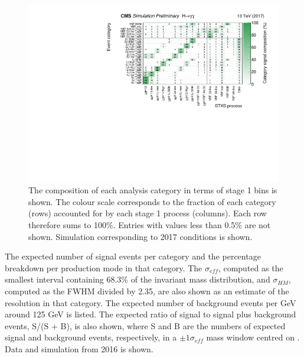 {\begin{figure}[hptb]
\centering
\includegraphics[width=\textwidth]{Figures/Results/Cats2017.pdf}
\caption{
  The composition of each analysis category in terms of stage 1 bins is shown. 
  The colour scale corresponds to the fraction of each category (rows) 
  accounted for by each stage 1 process (columns). 
  Each row therefore sums to 100\%. 
  Entries with values less than 0.5\% are not shown. 
  Simulation corresponding to 2017 conditions is shown.
}
\label{fig:results_Cats2017}
\end{figure}

\begin{landscape}
  \begin{table}
    \resizebox{1.5\textwidth}{!}{}
    \caption{
      The expected number of signal events per category and
      the percentage breakdown per production mode in that category. 
      The $\sigma_{eff}$, computed as the smallest interval containing 68.3\% 
      of the invariant mass distribution, and $\sigma_{HM}$, computed as the FWHM divided by 2.35,
      are also shown as an estimate of the \mgg resolution in that category.
      The expected number of background events per GeV around 125 GeV is listed.
      The expected ratio of signal to signal plus background events, S/(S + B), is also shown,
      where S and B are the numbers of expected signal and background events, respectively, 
      in a $\pm 1 \sigma_{eff}$ mass window centred on \mH.
      Data and simulation from 2016 is shown.}
    \label{tab:results_yields2016}
  \end{table}
\end{landscape}

}
